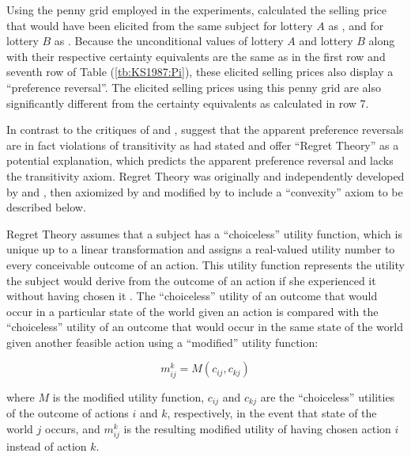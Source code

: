 \documentclass[../main.tex]{subfiles}
\begin{document}
Using the penny grid employed in the \textcite{Grether1979} experiments, \textcite[680]{Karni1987} calculated the selling price that would have been elicited from the same subject for lottery $A$ as , and for lottery $B$ as .
Because the unconditional values of lottery $A$ and lottery $B$ along with their respective certainty equivalents are the same as in the first row and seventh row of Table (\ref{tb:KS1987:Pi}), these elicited selling prices also display a \enquote{preference reversal}.
The elicited selling prices using this penny grid are also significantly different from the certainty equivalents as calculated in row 7.

In contrast to the critiques of \textcite{Holt1986} and \textcite{Karni1987}, \textcite{Loomes1989} suggest that the apparent preference reversals are in fact violations of transitivity as \textcite[623]{Grether1979} had stated and offer \enquote{Regret Theory} as a potential explanation, which predicts the apparent preference reversal and lacks the transitivity axiom.
Regret Theory was originally and independently developed by \textcite{Loomes1982} and \textcite{Bell1982}, then axiomized by \textcite{Fishburn1987} and modified by \textcite{Loomes1987} to include a \enquote{convexity} axiom to be described below.

Regret Theory assumes that a subject has a \enquote{choiceless} utility function, which is unique up to a linear transformation and assigns a real-valued utility number to every conceivable outcome of an action.
This utility function represents the utility the subject would derive from the outcome of an action if she experienced it without having chosen it \parencite[807]{Loomes1987}.
The \enquote{choiceless} utility of an outcome that would occur in a particular state of the world given an action is compared with the \enquote{choiceless} utility of an outcome that would occur in the same state of the world given another feasible action using a \enquote{modified} utility function:

\begin{equation}
	\label{eq:LS1987:mu}
	m^k_{ij} = M( c_{ij} , c_{kj} )
\end{equation}

\noindent where $M$ is the modified utility function, $c_{ij}$ and $c_{kj}$ are the \enquote{choiceless} utilities of the outcome of actions $i$ and $k$, respectively, in the event that state of the world $j$ occurs, and $m^k_{ij}$ is the resulting modified utility of having chosen action $i$ instead of action $k$.
\end{document}
